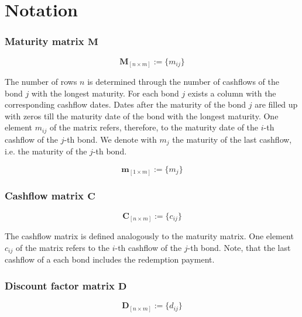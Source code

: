 
\section{Notation}
\label{sec:notation}

\subsubsection*{Maturity matrix $\bm{M}$}

\begin{equation}\label{maturitym}
\bm{M}_{\left[n\times m\right]}:= \{m_{ij}\}
\end{equation}

The number of rows $n$ is determined through the number of cashflows of the bond $j$ with the longest maturity. For each bond $j$ exists a column with the corresponding cashflow dates. Dates after the maturity of the bond $j$ are filled up with zeros till the maturity date of the bond with the longest maturity. One element $m_{ij}$ of the matrix  refers, therefore, to the maturity date of  the $i$-th cashflow of the $j$-th bond. We denote with $m_j$ the maturity of the last cashflow, i.e. the maturity of the $j$-th bond.

\begin{equation}\label{weights}
    \bm{m}_{\left[1\times m\right]}:= \{m_j\}
\end{equation}

\subsubsection*{Cashflow matrix $\bm{C}$}

 \begin{equation}\label{cashflowm}
\bm{C}_{\left[n\times m\right]}:= \{c_{ij}\}
\end{equation}

 The cashflow matrix is defined analogously to the maturity matrix.  One element $c_{ij}$  of the matrix refers to the $i$-th cashflow of the $j$-th bond. Note, that the last cashflow of a each bond includes the redemption payment.

\subsubsection*{Discount factor matrix $\bm{D}$}

 \begin{equation}\label{discountm}
\bm{D}_{\left[n\times m\right]}:= \{d_{ij}\}
\end{equation}

